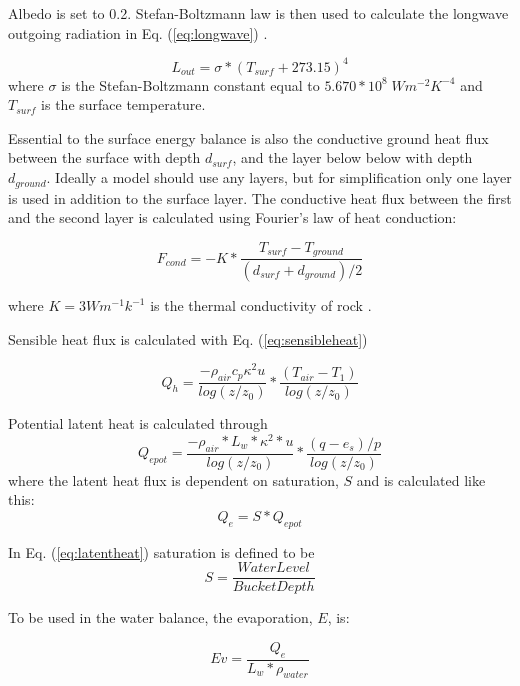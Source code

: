 \documentclass[a4paper,11pt,twocolumn]{article}
\begin{document}
Albedo is set to 0.2. Stefan-Boltzmann law is then used to calculate the longwave outgoing radiation in Eq. (\ref{eq:longwave}) \cite{dingman}.

\begin{equation}
	L_{out} = \sigma * (T_{surf}+273.15)^4
	\label{eq:longwave}
\end{equation}
where $\sigma$ is the Stefan-Boltzmann constant equal to $5.670*10^8 \; Wm^{-2}K^{-4}$ and $T_{surf}$ is the surface temperature. 

Essential to the surface energy balance is also the conductive ground heat flux between the surface with depth $d_{surf}$, and the layer below below with depth $d_{ground}$. Ideally a model should use any layers, but for simplification only one layer is used in addition to the surface layer. The conductive heat flux between the first and the second layer is calculated using Fourier's law of heat conduction:

\begin{equation}
F_{cond} = 
-K*\frac{T_{surf}-T_{ground}}{(d_{surf}+d_{ground})/2}
\end{equation}

where $K = 3 Wm^{-1}k^{-1}$ is the thermal conductivity of rock \cite{labus}. 

Sensible heat flux is calculated with Eq. (\ref{eq:sensibleheat})

\begin{equation}
Q_h = \frac{-\rho_{air}c_p\kappa^2u}{log(z/z_0)}* \frac{(T_{air}-T_1)}{log(z/z_0)}
\label{eq:sensibleheat}
\end{equation}

Potential latent heat is calculated through 
\begin{equation}
Q_{e pot} = \frac{-\rho_{air}*L_w*\kappa^2*u}{log(z/z_0)}*\frac{(q-e_s)/p}{log(z/z_0)}
\end{equation}
where the latent heat flux is dependent on saturation, $S$ and is calculated like this:
\begin{equation}
Q_e = S*Q_{e pot}
\label{eq:latentheat}
\end{equation}

In Eq. (\ref{eq:latentheat}) saturation is defined to be
\begin{equation}
S = \frac{Water Level}{Bucket Depth}
\end{equation}

To be used in the water balance, the evaporation, $E$, is: 

\begin{equation}
Ev = \frac{Q_e}{L_w*\rho_{water}}
\end{equation}
\end{document}
